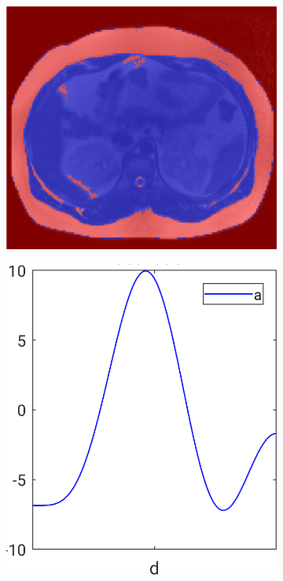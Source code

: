\documentclass[10pt,twoside]{book}
\begin{document}
\begin{figure}
\begin{subfigure}{0.3\textwidth}
    \caption{}
    \label{fig:logisticRegressionImageClassification_b}
  \end{subfigure}
  \begin{subfigure}{0.3\textwidth}
    \centering
    \includegraphics[width=\textwidth]{scenario1_finalSegmentationOverlay}
    \caption{}
    \label{fig:logisticRegressionImageClassification_c}
  \end{subfigure}
  \begin{subfigure}{0.35\textwidth}
    \centering
    \includegraphics[width=\textwidth]{scenario1_training_activation}

\end{subfigure}
\end{figure}
\end{document}
